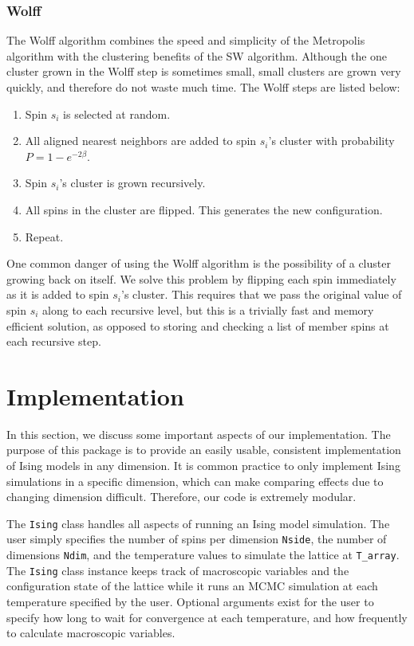 \documentclass[a4paper]{article}
\begin{document}
\subsubsection{Wolff}

The Wolff algorithm combines the speed and simplicity of the Metropolis algorithm with the clustering benefits of the SW algorithm. Although the one cluster grown in the Wolff step is sometimes small, small clusters are grown very quickly, and therefore do not waste much time. The Wolff steps are listed below:

\begin{enumerate}
	\item Spin $s_{i}$ is selected at random.
	\item All aligned nearest neighbors are added to spin $s_{i}$'s cluster with probability $P=1-e^{-2\beta}$.
	\item Spin $s_{i}$'s cluster is grown recursively.
	\item All spins in the cluster are flipped. This generates the new configuration.
	\item Repeat.
\end{enumerate}

One common danger of using the Wolff algorithm is the possibility of a cluster growing back on itself. We solve this problem by flipping each spin immediately as it is added to spin $s_{i}$'s cluster. This requires that we pass the original value of spin $s_{i}$ along to each recursive level, but this is a trivially fast and memory efficient solution, as opposed to storing and checking a list of member spins at each recursive step.

\section{Implementation}

In this section, we discuss some important aspects of our implementation. The purpose of this package is to provide an easily usable, consistent implementation of Ising models in any dimension. It is common practice to only implement Ising simulations in a specific dimension, which can make comparing effects due to changing dimension difficult. Therefore, our code is extremely modular.  

The \texttt{Ising} class handles all aspects of running an Ising model simulation.  The user simply specifies the number of spins per dimension \texttt{Nside}, the number of dimensions \texttt{Ndim}, and the temperature values to simulate the lattice at \texttt{T\_array}. The \texttt{Ising} class instance keeps track of macroscopic variables and the configuration state of the lattice while it runs an MCMC simulation at each temperature specified by the user. Optional arguments exist for the user to specify how long to wait for convergence at each temperature, and how frequently to calculate macroscopic variables.
\end{document}
